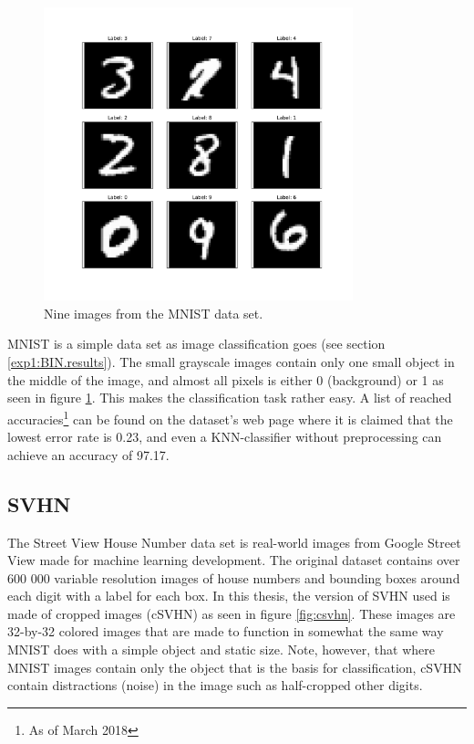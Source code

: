 \begin{figure}[p!]
    \centering
    \includegraphics[width=0.8\textwidth]{Chapters/3.Implementation/figures/MNIST.pdf}
    \caption[MNIST example]{Nine images from the MNIST data set.}
    \label{fig:mnist}
\end{figure}

MNIST is a simple data set as image classification goes (see section \ref{exp1:BIN.results}). The small grayscale images contain only one small object in the middle of the image, and almost all pixels is either 0 (background) or 1 as seen in figure \ref{fig:mnist}. This makes the classification task rather easy. A list of reached accuracies\footnote{As of March 2018} can be found on the dataset's web page where it is claimed that the lowest error rate is 0.23\cite{goodmnist}, and even a KNN-classifier without preprocessing can achieve an accuracy of 97.17. 


\subsection{SVHN}\label{Implementation:SVHN}
The Street View House Number\cite{SVHN} data set is real-world images from Google Street View made for machine learning development. The original dataset contains over 600 000 variable resolution images of house numbers and bounding boxes around each digit with a label for each box. In this thesis, the version of SVHN used is made of cropped images (cSVHN) as seen in figure \ref{fig:csvhn}. These images are 32-by-32 colored images that are made to function in somewhat the same way MNIST does with a simple object and static size. Note, however, that where MNIST images contain only the object that is the basis for classification, cSVHN contain distractions (noise) in the image such as half-cropped other digits. 

